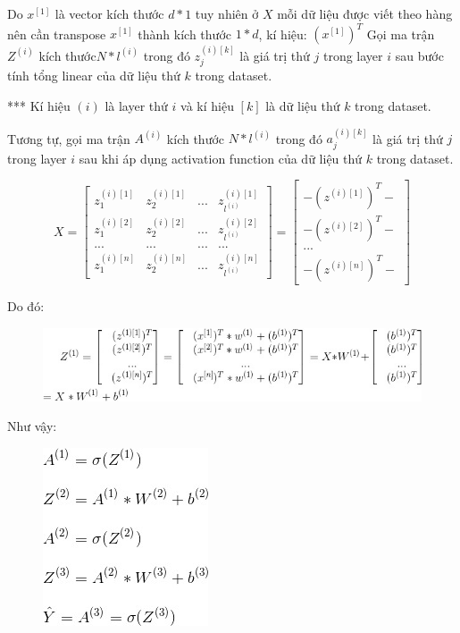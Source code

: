 Do $x^{[1]}$ là vector kích thước $d*1$ tuy nhiên ở $X$ mỗi dữ liệu được viết theo hàng nên cần transpose $x^{[1]}$ thành kích thước $1*d$, kí hiệu: $(x^{[1]})^T$
Gọi ma trận $Z^{(i)}$ kích thước$ N*l^{(i)}$ trong đó $z_{j}^{(i)[k]}$ là giá trị thứ $j$ trong layer $i$ sau bước tính tổng linear của dữ liệu thứ $k$ trong dataset.

*** Kí hiệu $(i)$ là layer thứ $i$ và kí hiệu $[k]$ là dữ liệu thứ $k$ trong dataset.

Tương tự, gọi ma trận $A^{(i)}$ kích thước $N*l^{(i)}$ trong đó $a_{j}^{(i)[k]}$ là giá trị thứ $j$ trong layer $i$ sau khi áp dụng activation function của dữ liệu thứ $k$ trong dataset.

$$ X = \begin{bmatrix}z_{1}^{(i)[1]}&z_{2}^{(i)[1]}&...&z_{l^{(i)}}^{(i)[1]}\\z_{1}^{(i)[2]}&z_{2}^{(i)[2]}&...&z_{l^{(i)}}^{(i)[2]}\\...&...&...&...\\z_{1}^{(i)[n]}&z_{2}^{(i)[n]}&...&z_{l^{(i)}}^{(i)[n]}\end{bmatrix} =  \begin{bmatrix}-(z^{(i)[1]})^{T}-\\-(z^{(i)[2]})^{T}-\\...\\-(z^{(i)[n]})^{T}-\end{bmatrix} $$

Do đó:

\FloatBarrier
\begin{figure}[htp]
\begin{center}
\includegraphics[scale=0.75]{chap2/c2_figs/3.jpg}
\end{center}
\label{fig:feed_forward}
\end{figure}
\FloatBarrier
Như vậy:

\FloatBarrier
\begin{figure}[htp]
\begin{center}
\includegraphics[scale=0.75]{chap2/c2_figs/4.jpg}
\end{center}
\label{fig:feed_forward}
\end{figure}
\FloatBarrier

